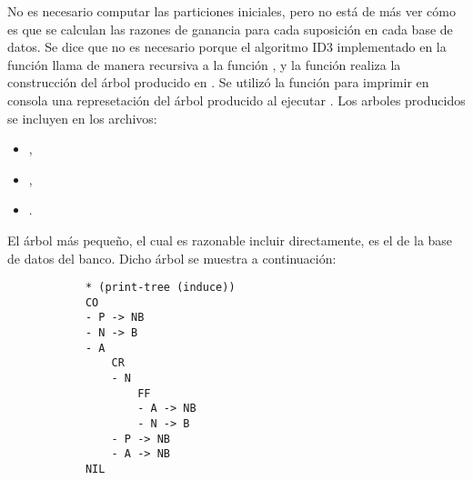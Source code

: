 \begin{itemize}
\begin{solution}
        No es necesario computar las particiones iniciales, pero no está de más ver cómo es que se calculan las razones de ganancia para cada suposición en cada base de datos. Se dice que no es necesario porque el algoritmo ID3 implementado en la función  llama de manera recursiva a la función , y la función  realiza la construcción del árbol producido en . Se utilizó la función  para imprimir en consola una represetación del árbol producido al ejecutar . Los arboles producidos se incluyen en los archivos:
        \begin{itemize}
            \item {},
            \item {},
            \item {}.
        \end{itemize}

        El árbol más pequeño, el cual es razonable incluir directamente, es el de la base de datos del banco. Dicho árbol se muestra a continuación:
        \begin{verbatim}
            * (print-tree (induce))
            CO
            - P -> NB
            - N -> B
            - A
                CR
                - N
                    FF
                    - A -> NB
                    - N -> B
                - P -> NB
                - A -> NB
            NIL
        \end{verbatim}


\end{solution}
\end{itemize}
